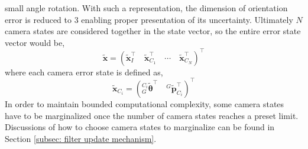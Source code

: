small angle rotation. With such a representation, the dimension of orientation error is reduced to $3$ enabling proper presentation of its uncertainty. Ultimately $N$ camera states are considered together in the state vector, so the entire error state vector would be,
\begin{equation*}
\tilde{\mathbf{x}} = 
\left(
\tilde{\mathbf{x}}_I^\top \quad
\tilde{\mathbf{x}}_{C_1}^\top \quad
\cdots \quad 
\tilde{\mathbf{x}}_{C_N}^\top
\right)^\top
\end{equation*}
where each camera error state is defined as,
\begin{equation*}
\tilde{\mathbf{x}}_{C_i} = 
\left(
{}^{C_i}_G\tilde{\bm{\theta}}^\top \quad
{}^G\tilde{\mathbf{p}}_{C_i}^\top
\right)^\top
\end{equation*}
In order to maintain bounded computational complexity, some camera states have to be marginalized once the number of camera states reaches a preset limit. Discussions of how to choose camera states to marginalize can be found in Section \ref{subsec: filter update mechanism}. 














